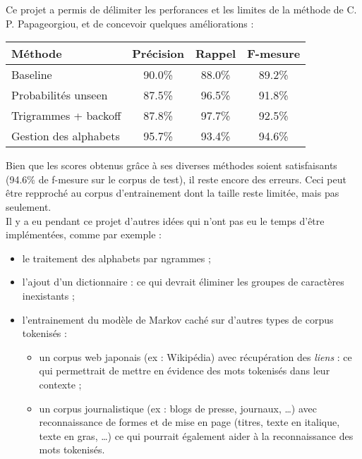 
Ce projet a permis de délimiter les perforances et les limites de la méthode de C. P. Papageorgiou, et de concevoir quelques améliorations :
\begin{center}
	\begin{tabular}{|l c c c|}
	  	\hline
	  	\textbf{Méthode} & \textbf{Précision} & \textbf{Rappel} & \textbf{F-mesure}\\
	  	\hline
	  	Baseline & 90.0\% & 88.0\% & 89.2\% \\
		Probabilités unseen & 87.5\% & 96.5\% & 91.8\% \\
		Trigrammes + backoff & 87.8\% & 97.7\% & 92.5\% \\
		Gestion des alphabets & 95.7\% & 93.4\% & 94.6\% \\
	  	\hline
	\end{tabular}
\end{center}
\vspace{0.3cm}

Bien que les scores obtenus grâce à ses diverses méthodes soient satisfaisants (94.6\% de f-mesure sur le corpus
de test), il reste encore des erreurs. Ceci peut être repproché au corpus d'entrainement dont la taille reste limitée, mais pas seulement.\\

Il y a eu pendant ce projet d'autres idées qui n'ont pas eu le temps d'être implémentées, comme par exemple :
\begin{itemize}
	\item le traitement des alphabets par ngrammes ;
	\item l'ajout d'un dictionnaire : ce qui devrait éliminer les groupes de caractères inexistants ;
	\item l'entrainement du modèle de Markov caché sur d'autres types de corpus tokenisés :
	\begin{itemize}
		\item un corpus web japonais (ex : Wikipédia) avec récupération des \textit{liens} : ce qui permettrait de mettre en évidence des mots tokenisés dans leur contexte ;
		\item un corpus journalistique (ex : blogs de presse, journaux, \dots) avec reconnaissance de formes et de mise en page (titres, texte en italique, texte en gras, \dots ) ce qui pourrait également aider à la reconnaissance des mots tokenisés.
		\end{itemize}
\end{itemize}  
